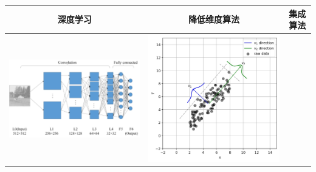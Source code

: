 \begin{longtable}[]{ccc}
    \label{fig:2.5.5}
\toprule
深度学习 & 降低维度算法 & 集成算法
\tabularnewline
\midrule
\endhead
\begin{minipage}{1.0\linewidth}
\includegraphics[width=1.0\linewidth]{./img/ch2/2-2-10.png}  
\end{minipage}
 &
\begin{minipage}{1.0\linewidth}
\includegraphics[width=1.0\linewidth]{./img/ch2/2-2-11.png}  
\end{minipage}
 &
\begin{minipage}{1.0\linewidth}

\end{minipage}
\end{longtable}
